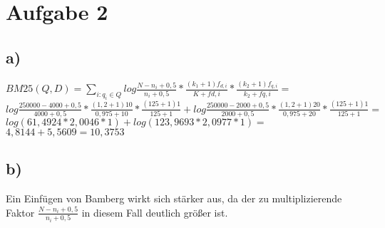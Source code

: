 \section*{Aufgabe 2}

\subsection*{a)}

$BM25(Q, D) = \sum_{i:q_{i}\in Q} log \frac{N-n_{i}+0,5}{n_{i}+0,5}*\frac{(k_{1}+1)f_{d,i}}{K+f{d,i}}*\frac{(k_{2}+1)f_{q,i}}{k_{2}+f{q,i}} =$ \\
$log \frac{250000-4000+0,5}{4000+0,5}*\frac{(1,2+1)10}{0,975+10}*\frac{(125+1)1}{125+1} + log \frac{250000-2000+0,5}{2000+0,5}*\frac{(1,2+1)20}{0,975+20}*\frac{(125+1)1}{125+1} =$\\
$log (61,4924 * 2,0046 * 1) + log (123,9693 * 2,0977 * 1) =$ \\
$4,8144 + 5,5609 = 10,3753$

\subsection*{b)}

Ein Einfügen von Bamberg wirkt sich stärker aus, da der zu multiplizierende Faktor $\frac{N-n_{i}+0,5}{n_{i}+0,5}$ in diesem Fall deutlich größer ist.